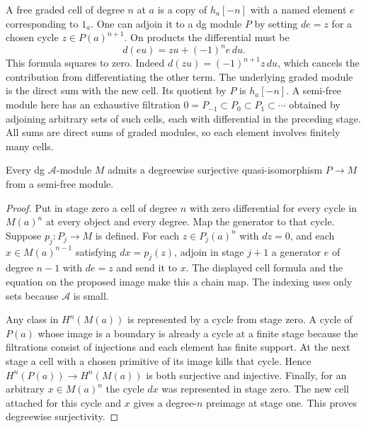 A free graded cell of degree \(n\) at \(a\) is a copy of
\(h_a[-n]\) with a named element \(e\) corresponding to \(1_a\).
One can adjoin it to a dg module \(P\) by setting \(de=z\) for
a chosen cycle \(z\in P(a)^{n+1}\). On products the
differential must be
\[
                 d(eu)=z u+(-1)^n e\,d u.
\]
This formula squares to zero. Indeed \(d(z u)=(-1)^{n+1}z\,du\),
which cancels the contribution from differentiating the other
term. The underlying graded module is the direct sum with the
new cell. Its quotient by \(P\) is \(h_a[-n]\). A semi-free module
here has an exhaustive filtration
\(0=P_{-1}\subset P_0\subset P_1\subset\cdots\)
obtained by adjoining arbitrary sets of such cells, each with
differential in the preceding stage. All sums are direct sums of
graded modules, so each element involves finitely many cells.

\begin{theorem}\label{res:G06}
Every dg \(\mathcal A\)-module \(M\) admits a degreewise surjective
quasi-isomorphism \(P\to M\) from a semi-free module.
\end{theorem}
\begin{proof}
Put in stage zero a cell of degree \(n\) with zero differential
for every cycle in \(M(a)^n\) at every object and every degree.
Map the generator to that cycle. Suppose \(p_j:P_j\to M\) is
defined. For each \(z\in P_j(a)^n\) with \(dz=0\), and each
\(x\in M(a)^{n-1}\) satisfying \(dx=p_j(z)\), adjoin in stage \(j+1\)
a generator \(e\) of degree \(n-1\) with \(de=z\) and send it to \(x\).
The displayed cell formula and the equation on the proposed image
make this a chain map. The indexing uses only sets because
\(\mathcal A\) is small.

Any class in \(H^n(M(a))\) is represented by a cycle from stage zero.
A cycle of \(P(a)\) whose image is a boundary is already a cycle
at a finite stage because the filtrations consist of injections
and each element has finite support. At the next stage a cell
with a chosen primitive of its image kills that cycle. Hence
\(H^n(P(a))\to H^n(M(a))\) is both surjective and injective.
Finally, for an arbitrary \(x\in M(a)^n\) the cycle \(dx\) was
represented in stage zero. The new cell attached for this cycle
and \(x\) gives a degree-\(n\) preimage at stage one. This proves
degreewise surjectivity.
\end{proof}
